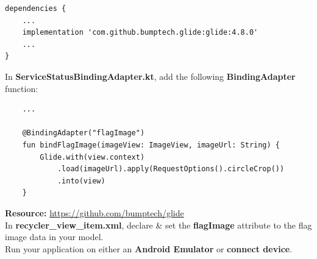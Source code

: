 \documentclass{article}
\begin{document}
\begin{verbatim}
dependencies {
    ...
    implementation 'com.github.bumptech.glide:glide:4.8.0'
    ...
}
\end{verbatim}

In \textbf{ServiceStatusBindingAdapter.kt}, add the following \textbf{BindingAdapter} function:

\begin{verbatim}
    ...

    @BindingAdapter("flagImage")
    fun bindFlagImage(imageView: ImageView, imageUrl: String) {
        Glide.with(view.context)
            .load(imageUrl).apply(RequestOptions().circleCrop())
            .into(view)
    }
\end{verbatim}

\textbf{Resource:} \href{https://github.com/bumptech/glide}{https://github.com/bumptech/glide} \\

In \textbf{recycler\_view\_item.xml}, declare \& set the \textbf{flagImage} attribute to the flag image data in your model. \\

Run your application on either an \textbf{Android Emulator} or \textbf{connect device}. \\ 
\end{document}
